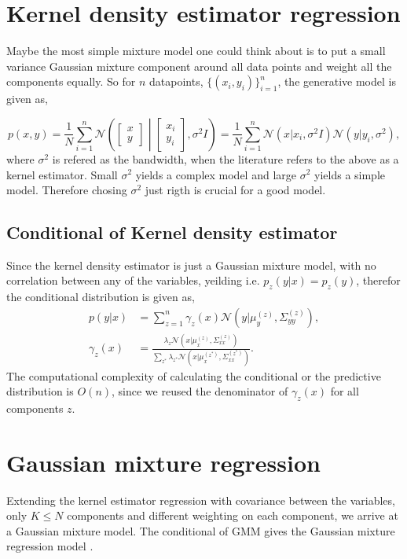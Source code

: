 \section{Kernel density estimator regression}
Maybe the most simple mixture model one could think about is to put a small variance Gaussian mixture
component around all data points and weight all the components equally. So for $n$ datapoints,
$\{(x_i,y_i)\}_{i=1}^n$, the generative model is given as, 

$$p(x,y) = \frac{1}{N} \sum_{i=1}^n \mathcal{N}\left(\begin{bmatrix}x\\y\end{bmatrix} \middle|
\begin{bmatrix}x_i\\y_i\end{bmatrix}, \sigma^2 I \right) = \frac{1}{N} \sum_{i=1}^n 
\mathcal{N}(x|x_i, \sigma^2 I)\mathcal{N}(y|y_i, \sigma^2),$$
where $\sigma^2$ is refered as the bandwidth, when the literature refers to the above as a kernel estimator. 
Small $\sigma^2$ yields a complex model and large $\sigma^2$ yields a simple model. Therefore chosing $\sigma^2$
just rigth is crucial for a good model. 


\subsection{Conditional of Kernel density estimator}
Since the kernel density estimator is just a Gaussian mixture model, with no correlation between
any of the variables, yeilding i.e. $p_z(y|x) = p_z(y)$, therefor the conditional distribution is
given as, 
\begin{align}
    p(y|x) &= \sum_{z=1}^n \gamma_z(x) \mathcal{N}(y|\mu_{y}^{(z)},\Sigma_{yy}^{(z)} ),\\
    \gamma_z(x) &= \frac{\lambda_z \mathcal{N}(x|\mu_{x}^{(z)},\Sigma_{xx}^{(z)})}{\sum_{z^*}
\lambda_{z^*} \mathcal{N}(x|\mu_{x}^{(z^*)},\Sigma_{xx}^{(z^*)})}.
\end{align}
The computational complexity of calculating the conditional or the predictive distribution is
$O(n)$, since we reused the denominator of $\gamma_z(x)$ for all components $z$. 

\section{Gaussian mixture regression}
Extending the kernel estimator regression with covariance between the variables, only $K \leq N$ components 
and different weighting on each component, we arrive at a Gaussian mixture model. The conditional of GMM 
gives the Gaussian mixture regression model \cite{GMR}. 

